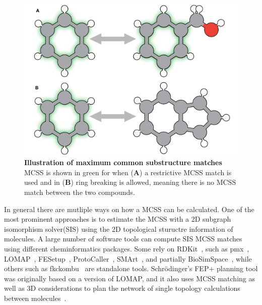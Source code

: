 \documentclass[9pt,bestpractices,pubversion]{livecoms}
\begin{document}
\begin{figure}
    \includegraphics[width=0.95\linewidth]{figures/fig4_mcs/Figure.pdf}
    \caption{\textbf{Illustration of maximum common substructure matches} MCSS is shown in green for when (\textbf{A}) a restrictive MCSS match is used and in (\textbf{B}) ring breaking is allowed, meaning there is no MCSS match between the two compounds.}
    \label{fig:fig_mcss}
\end{figure} 

In general there are mutliple ways on how a MCSS can be calculated. One of the most prominent approaches is to estimate the MCSS with a 2D subgraph isomorphism solver(SIS) using the 2D topological stuructre information of molecules\cite{raymond2002maximum}.
A large number of software tools can compute SIS MCSS matches using different cheminformatics packages. Some rely on RDKit~\cite{rdkit2019Dec}, such as pmx~\cite{gapsys2015pmx}, LOMAP~\cite{liu2013lead}, FESetup~\cite{loeffler2015fesetup}, ProtoCaller~\cite{suruzhon2020protocaller}, SMArt~\cite{petrov2021perturbation}, and partially BioSimSpace~\cite{hedges2019biosimspace}, while others such as fkckombu~\cite{kawabata20143d} are standalone tools. Schr\"{o}dinger's FEP+ planning tool was originally based on a version of LOMAP, and it also uses MCSS matching as well as 3D considerations to plan the network of single topology calculations between molecules~\cite{wang2015accurate}. 
\end{document}
